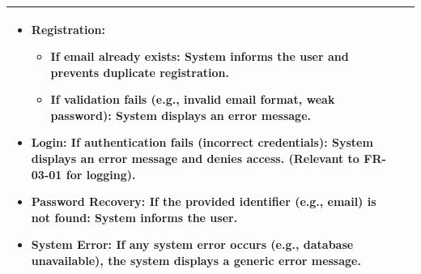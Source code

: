 \begin{minipage}{\textwidth}
\begin{tabularx}{\textwidth}{|p{}|X|}
{\begin{itemize}
            \item \textbf{Registration:}
                \setlist[itemize,2]{nosep, leftmargin=1em, itemsep=0pt, parsep=0pt, topsep=0pt, partopsep=0pt, after=\strut}
                \begin{itemize}
                    \item If email already exists: System informs the user and prevents duplicate registration.
                    \item If validation fails (e.g., invalid email format, weak password): System displays an error message.
                \end{itemize}
            \item \textbf{Login:} If authentication fails (incorrect credentials): System displays an error message and denies access. (Relevant to FR-03-01 for logging).
            \item \textbf{Password Recovery:} If the provided identifier (e.g., email) is not found: System informs the user.
            \item \textbf{System Error:} If any system error occurs (e.g., database unavailable), the system displays a generic error message.
        \end{itemize}%
        } \\
    \hline
\end{tabularx}
\end{minipage}
\bigskip %

